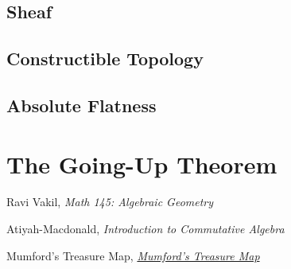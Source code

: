 \documentclass[]{report}
\begin{document}
\section{Sheaf}
\section{Constructible Topology}
\section{Absolute Flatness}

\chapter{The Going-Up Theorem}

\begin{thebibliography}{9}

    Ravi Vakil,
    \textit{Math 145: Algebraic Geometry}

    Atiyah-Macdonald, 
    \textit{Introduction to Commutative Algebra}

    Mumford's Treasure Map,
    \href{https://web.archive.org/web/20201130150255/http://www.neverendingbooks.org/mumfords-treasure-map}{\textit{Mumford's Treasure Map}}
\end{thebibliography}
\end{document}
